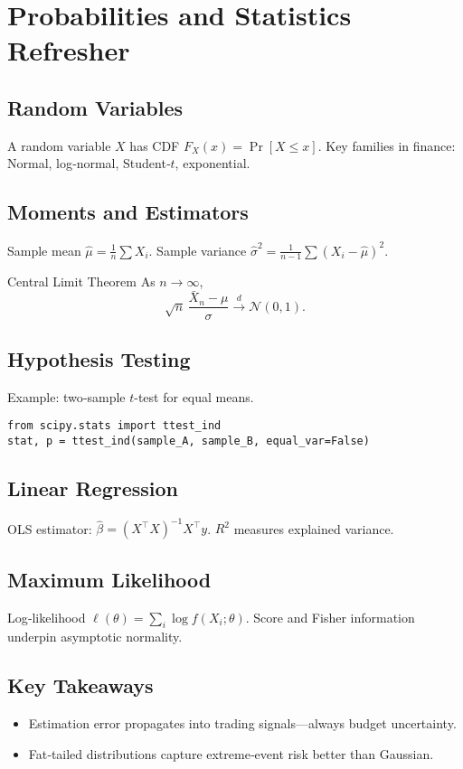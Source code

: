 \chapter{Probabilities and Statistics Refresher}\label{ch:stats}

\section{Random Variables}

A random variable \(X\) has CDF \(F_X(x)=\Pr[X\le x]\).
Key families in finance:
Normal, log‑normal, Student‑\(t\), exponential.

\section{Moments and Estimators}

Sample mean \(\hat\mu = \frac1n\sum X_i\).  
Sample variance \(\hat\sigma^2 = \frac1{n-1}\sum(X_i-\hat\mu)^2\).

\begin{definition}{Central Limit Theorem}{}
As \(n\to\infty\),
\[
\sqrt{n}\,\frac{\bar X_n-\mu}{\sigma}\xrightarrow{d}\mathcal N(0,1).
\]
\end{definition}

\section{Hypothesis Testing}
Example: two‑sample \(t\)-test for equal means.

\begin{verbatim}
from scipy.stats import ttest_ind
stat, p = ttest_ind(sample_A, sample_B, equal_var=False)
\end{verbatim}

\section{Linear Regression}

OLS estimator:
\(\hat\beta = (X^\top X)^{-1} X^\top y\).
\(R^2\) measures explained variance.

\section{Maximum Likelihood}

Log‑likelihood \(\ell(\theta) = \sum_i \log f(X_i;\theta)\).
Score and Fisher information underpin asymptotic normality.

\section*{Key Takeaways}
\begin{itemize}
  \item Estimation error propagates into trading signals—always budget uncertainty.
  \item Fat‑tailed distributions capture extreme‐event risk better than Gaussian.
\end{itemize}
